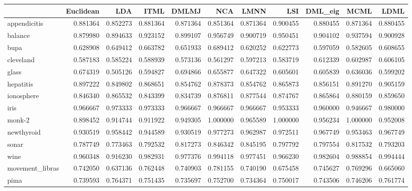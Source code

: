 \begin{tabular}{lrrrrrrrrrr}
\toprule
{} &  Euclidean &       LDA &      ITML &     DMLMJ &       NCA &      LMNN &       LSI &   DML\_eig &      MCML &      LDML \\
\midrule
appendicitis    &   0.881364 &  0.852273 &  0.881364 &  0.871364 &  0.851364 &  0.871364 &  0.900455 &  0.880455 &  0.871364 &  0.880455 \\
balance         &   0.879980 &  0.894633 &  0.923152 &  0.899107 &  0.956749 &  0.900719 &  0.950451 &  0.904102 &  0.937594 &  0.900928 \\
bupa            &   0.628908 &  0.649412 &  0.663782 &  0.651933 &  0.689412 &  0.620252 &  0.622773 &  0.597059 &  0.582605 &  0.608655 \\
cleveland       &   0.587183 &  0.585224 &  0.588939 &  0.573136 &  0.561297 &  0.597213 &  0.583719 &  0.612339 &  0.602987 &  0.606105 \\
glass           &   0.674319 &  0.505126 &  0.594827 &  0.694866 &  0.655877 &  0.647322 &  0.605601 &  0.605839 &  0.636036 &  0.599202 \\
hepatitis       &   0.897222 &  0.849802 &  0.868651 &  0.854762 &  0.878373 &  0.854762 &  0.865873 &  0.856151 &  0.891270 &  0.905159 \\
ionosphere      &   0.846340 &  0.865532 &  0.843399 &  0.834739 &  0.876811 &  0.877544 &  0.874767 &  0.865864 &  0.880159 &  0.859650 \\
iris            &   0.966667 &  0.973333 &  0.973333 &  0.966667 &  0.966667 &  0.966667 &  0.953333 &  0.960000 &  0.946667 &  0.980000 \\
monk-2          &   0.898452 &  0.914744 &  0.911922 &  0.949305 &  1.000000 &  0.965589 &  1.000000 &  0.956234 &  1.000000 &  0.952008 \\
newthyroid      &   0.930519 &  0.958442 &  0.944589 &  0.930519 &  0.977273 &  0.962987 &  0.972511 &  0.967749 &  0.953463 &  0.967749 \\
sonar           &   0.787749 &  0.773463 &  0.792532 &  0.817273 &  0.846342 &  0.845195 &  0.797792 &  0.797554 &  0.817532 &  0.793203 \\
wine            &   0.960348 &  0.916230 &  0.982931 &  0.977376 &  0.994118 &  0.977451 &  0.966230 &  0.982604 &  0.988854 &  0.994444 \\
movement\_libras &   0.742050 &  0.637136 &  0.762448 &  0.740903 &  0.781155 &  0.740190 &  0.675458 &  0.745627 &  0.769296 &  0.665060 \\
pima            &   0.739593 &  0.764371 &  0.751435 &  0.735697 &  0.752700 &  0.734364 &  0.750017 &  0.743506 &  0.746206 &  0.761774 \\

\end{tabular}
